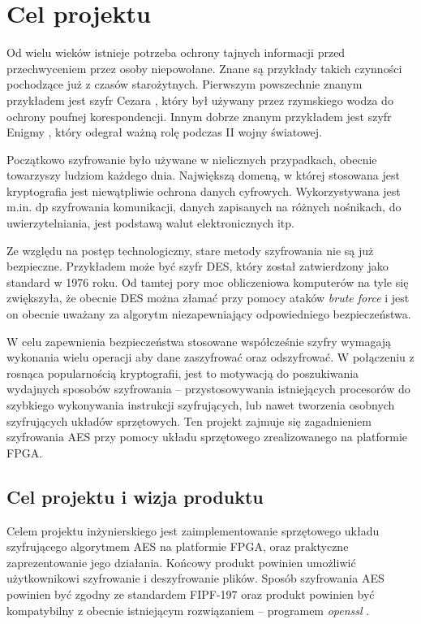 \section{Cel projektu}
\label{sec:cel-projektu}

Od wielu wieków istnieje potrzeba ochrony tajnych informacji przed przechwyceniem przez osoby niepowołane. Znane są przykłady takich czynności pochodzące już z czasów starożytnych. Pierwszym powszechnie znanym przykładem jest szyfr Cezara \cite{szyfr-cezara}, który był używany przez rzymskiego wodza do ochrony poufnej korespondencji. Innym dobrze znanym przykładem jest szyfr Enigmy \cite{szyfr-enigmy}, który odegrał ważną rolę podczas II wojny światowej.

Początkowo szyfrowanie było używane w nielicznych przypadkach, obecnie towarzyszy ludziom każdego dnia. Największą domeną, w której stosowana jest kryptografia jest niewątpliwie ochrona danych cyfrowych. Wykorzystywana jest m.in. dp szyfrowania komunikacji, danych zapisanych na różnych nośnikach, do uwierzytelniania, jest podstawą walut elektronicznych itp.

Ze względu na postęp technologiczny, stare metody szyfrowania nie są już bezpieczne. Przykładem może być szyfr DES, który został zatwierdzony jako standard w 1976 roku. Od tamtej pory moc obliczeniowa komputerów na tyle się zwiększyła, że obecnie DES można złamać przy pomocy ataków \textit{brute force} i jest on obecnie uważany za algorytm niezapewniający odpowiedniego bezpieczeństwa.

W celu zapewnienia bezpieczeństwa stosowane współcześnie szyfry wymagają wykonania wielu operacji aby dane zaszyfrować oraz odszyfrować. W połączeniu z rosnąca popularnością kryptografii, jest to motywacją do poszukiwania wydajnych sposobów szyfrowania -- przystosowywania istniejących procesorów do szybkiego wykonywania instrukcji szyfrujących, lub nawet tworzenia osobnych szyfrujących układów sprzętowych. Ten projekt zajmuje się zagadnieniem szyfrowania AES przy pomocy układu sprzętowego zrealizowanego na platformie FPGA.

\subsection{Cel projektu i wizja produktu}
Celem projektu inżynierskiego jest zaimplementowanie sprzętowego układu szyfrującego algorytmem AES na platformie FPGA, oraz praktyczne zaprezentowanie jego działania. Końcowy produkt powinien umożliwić użytkownikowi szyfrowanie i deszyfrowanie plików. Sposób szyfrowania AES powinien być zgodny ze standardem FIPF-197 \cite{aes-standard} oraz produkt powinien być kompatybilny z obecnie istniejącym rozwiązaniem -- programem \textit{openssl} \cite{openssl}.

